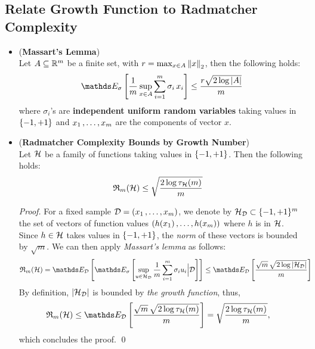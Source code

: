 \documentclass[11pt]{article}
\begin{document}
\subsection{Relate Growth Function to Radmatcher Complexity}
\begin{itemize}
\item \begin{lemma}(\textbf{Massart's Lemma}) \citep{mohri2018foundations}\\
Let $A \subseteq {\mathbb R}^m$ be a finite set, with $r = \max_{x \in A}\left\|x\right\|_{2}$, then the following holds:
\begin{align}
\E{\sigma}{\frac{1}{m}\sup_{x \in A}\sum_{i=1}^{m}\sigma_i\,x_i} \le \frac{r\sqrt{2 \log\abs{A}}}{m} \label{eqn: massart_lemma}
\end{align}
where $\sigma_i$'s are \textbf{independent uniform random variables} taking values in $\left\{-1, +1\right\}$ and $x_1 \,{,}\ldots{,}\, x_m$ are the components of vector $x$.
\end{lemma}

\item \begin{corollary} \label{cor: radmatcher_growth} (\textbf{Radmatcher Complexity Bounds by Growth Number}) \citep{mohri2018foundations}\\
Let ${\mathcal H}$ be a family of functions taking values in $\left\{-1, +1\right\}$. Then the following holds:
\begin{align}
{\mathfrak R}_{m}({\mathcal H}) &\le \sqrt{\frac{2 \log \tau_{{\mathcal H}}(m)}{m}} \label{eqn: growth_number_radmatcher_comp}
\end{align}
\end{corollary}
\begin{proof}
For a fixed sample ${\mathcal D} = (x_1 \,{,}\ldots{,}\, x_m)$, we denote by ${\mathcal H}_{{\mathcal D}} \subset \{-1, +1\}^{m}$ the set of vectors of function values $(h(x_1) \,{,}\ldots{,}\, h(x_m))$ where $h$ is in ${\mathcal H}$. Since $h\in {\mathcal H}$ takes values in $\left\{-1, +1\right\}$, the \emph{norm} of these vectors is bounded by $\sqrt{m}$. We can then apply
\emph{Massart's lemma} as follows:
\begin{align*}
\frR_{m}(\cH) &= \E{\cD}{\E{\sigma}{\sup_{u \in \cH_{\cD}}\frac{1}{m}\sum_{i=1}^{m}\sigma_i u_i \Big| \cD}} \le  \E{\cD}{\frac{\sqrt{m}\,\sqrt{2 \log\abs{\cH_{\cD}}}}{m}}
\end{align*}
By definition, $\left\lvert {\mathcal H}_{{\mathcal D}} \right\rvert$ is bounded by \emph{the growth function}, thus,
\begin{align*}
\frR_{m}(\cH)  &\le  \E{\cD}{\frac{\sqrt{m}\,\sqrt{2 \log \tau_{\cH}(m)}}{m}} = \sqrt{\frac{2 \log \tau_{\cH}(m)}{m}},
\end{align*}
which concludes the proof. \qed
\end{proof}
\end{itemize}
\end{document}
